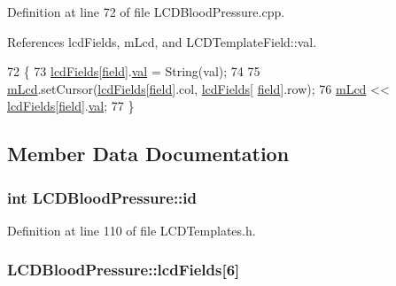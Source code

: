 Definition at line 72 of file L\-C\-D\-Blood\-Pressure.\-cpp.



References lcd\-Fields, m\-Lcd, and L\-C\-D\-Template\-Field\-::val.


\begin{DoxyCode}
72                                                        \{
73   \hyperlink{class_l_c_d_blood_pressure_a6e1365c0d4e86f192ce5b1daae22bb79}{lcdFields}[\hyperlink{_l_c_d_templates_8h_a20a49e010fbfc3a43959f12d92e01bb6}{field}].\hyperlink{struct_l_c_d_template_field_a6eb7ce0547fc28ac3a2538f0fac3f117}{val} = String(val);
74 
75   \hyperlink{class_l_c_d_blood_pressure_abb80767c8e4d018ced0356fe1623577f}{mLcd}.setCursor(\hyperlink{class_l_c_d_blood_pressure_a6e1365c0d4e86f192ce5b1daae22bb79}{lcdFields}[\hyperlink{struct_l_c_d_template_field}{field}].col, \hyperlink{class_l_c_d_blood_pressure_a6e1365c0d4e86f192ce5b1daae22bb79}{lcdFields}[
      \hyperlink{struct_l_c_d_template_field}{field}].row);
76   \hyperlink{class_l_c_d_blood_pressure_abb80767c8e4d018ced0356fe1623577f}{mLcd} << \hyperlink{class_l_c_d_blood_pressure_a6e1365c0d4e86f192ce5b1daae22bb79}{lcdFields}[\hyperlink{_l_c_d_templates_8h_a20a49e010fbfc3a43959f12d92e01bb6}{field}].\hyperlink{struct_l_c_d_template_field_a6eb7ce0547fc28ac3a2538f0fac3f117}{val};
77 \}
\end{DoxyCode}


\subsection{Member Data Documentation}
\hypertarget{class_l_c_d_blood_pressure_a696aeab13e1360ccab183461537b5901}{
\subsubsection[{id}]{\setlength{\rightskip}{0pt plus 5cm}int L\-C\-D\-Blood\-Pressure\-::id}}\label{class_l_c_d_blood_pressure_a696aeab13e1360ccab183461537b5901}


Definition at line 110 of file L\-C\-D\-Templates.\-h.

\hypertarget{class_l_c_d_blood_pressure_a6e1365c0d4e86f192ce5b1daae22bb79}{
\subsubsection[{lcd\-Fields}]{ L\-C\-D\-Blood\-Pressure\-::lcd\-Fields\mbox{[}6\mbox{]}}}\label{class_l_c_d_blood_pressure_a6e1365c0d4e86f192ce5b1daae22bb79}


